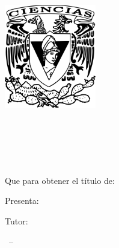 
  
\begin{titlepage}
\AddToShipoutPicture*{\BackgroundPic}



\begin{addmargin}[-1cm]{-3cm}
  \begin{center}
        \large

       \vspace{2cm}
        \includegraphics[width=4.0cm]{gfx/Escudo-FCIENCIAS.pdf} \\ \medskip
        \begingroup
            \spacedallcaps{\myUni} \\ \bigskip
        \endgroup
        
        \vfil
        
        \begingroup
            \spacedallcaps{\myFaculty} \\ \bigskip
        \endgroup
        
        \hfill

        \vfill
        
        \begingroup
            \color{CTtitle}\spacedallcaps{\myTitle} \\ \bigskip
        \endgroup
        \vfill
        \\[1.2cm]
        
        Que para obtener el título de: \\ \bigskip
        \myDegree

        \vspace{1.4cm}
        Presenta: \\ \bigskip
        \spacedlowsmallcaps{\myName}

        \vfill

        Tutor: \\ \bigskip
        \mySupervisor

      
        \vfill
        \myTime\ -- \myVersion

        \vfill

        \end{center}

\end{addmargin}
\end{titlepage}
